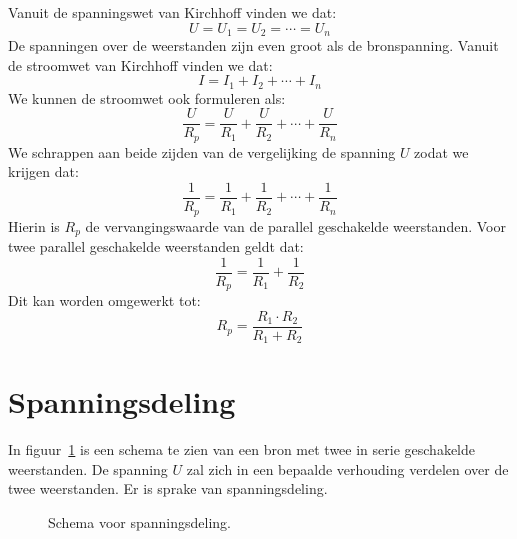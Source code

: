Vanuit de spanningswet van Kirchhoff vinden we dat:
%
\begin{equation}
U = U_1 = U_2 = \cdots = U_n
\end{equation}
%
De spanningen over de weerstanden zijn even groot als de bronspanning.
Vanuit de stroomwet van Kirchhoff vinden we dat:
%
\begin{equation}
I = I_1 + I_2 + \cdots + I_n
\end{equation}
%
We kunnen de stroomwet ook formuleren als:
%
\begin{equation}
\dfrac{U}{R_p} = \dfrac{U}{R_1} + \dfrac{U}{R_2} + \cdots + \dfrac{U}{R_n}
\end{equation}
%
We schrappen aan beide zijden van de vergelijking de spanning $U$ zodat we krijgen dat:
%
\begin{equation}
\dfrac{1}{R_p} = \dfrac{1}{R_1} + \dfrac{1}{R_2} + \cdots + \dfrac{1}{R_n}
\end{equation}
%
Hierin is $R_p$ de vervangingswaarde van de parallel geschakelde weerstanden.
Voor twee parallel geschakelde weerstanden geldt dat:
\begin{equation}
\dfrac{1}{R_p} = \dfrac{1}{R_1} + \dfrac{1}{R_2}
\end{equation}
%
Dit kan worden omgewerkt tot:
\begin{equation}
R_p = \dfrac{R_1\cdot R_2}{R_1+R_2}
\end{equation}


\section{Spanningsdeling}
In figuur~\ref{fig:gelspanningsdeling} is een schema te zien van een bron met twee in
serie geschakelde weerstanden. De spanning $U$ zal zich in een bepaalde verhouding
verdelen over de twee weerstanden. Er is sprake van spanningsdeling.

\begin{figure}[!ht]
\centering
{}
\caption{Schema voor spanningsdeling.}
\label{fig:gelspanningsdeling}
\end{figure}

